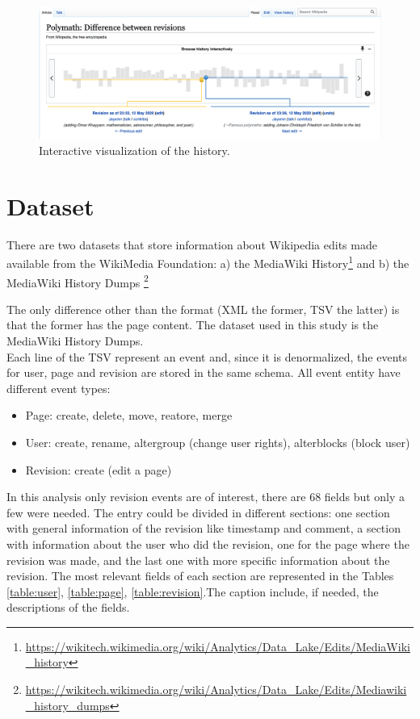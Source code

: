 \begin{figure}[H]
    \centering
    \includegraphics[width=1\textwidth]{./chapters/02/assets/history.png}
    \caption{Interactive visualization of the history.}
    \label{fig:history}
\end{figure}


\section{Dataset}
There are two datasets that store information about Wikipedia edits made available from the WikiMedia
Foundation: a) the MediaWiki History\footnote{\url{https://wikitech.wikimedia.org/wiki/Analytics/Data_Lake/Edits/MediaWiki_history}} 
and b) the MediaWiki History Dumps \footnote{\url{https://wikitech.wikimedia.org/wiki/Analytics/Data_Lake/Edits/Mediawiki_history_dumps}}


The only difference other than the format (XML the former, TSV the latter) is that the former has the
page content. The dataset used in this study is the MediaWiki History Dumps.\\

Each line of the TSV represent an event and, since it is denormalized, the events for user, page and
revision are stored in the same schema.
All event entity have different event types:
\begin{itemize}
    \item Page: create, delete, move, reatore, merge  
    \item User: create, rename, altergroup (change user rights), alterblocks (block user)
    \item Revision: create (edit a page)
\end{itemize}

In this analysis only revision events are of interest, there are 68 fields but only a few were
needed. The entry could be divided in different sections: one section with general information of
the revision like timestamp and comment, a section with information about the user who did the
revision, one for the page where the revision was made, and the last one with more specific
information about the revision. The most relevant fields of each section are represented in the Tables 
\ref{table:user}, \ref{table:page}, \ref{table:revision}.The caption include, if
needed, the descriptions of the fields.

